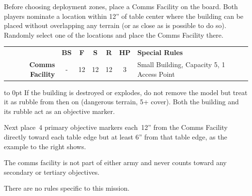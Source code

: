 

\begin{tablesetup}

  \hammerandanvil

  \smallskip%
  Before choosing deployment zones, place a Comms Facility on the
  board.  Both players nominate a location within 12'' of table center
  where the building can be placed without overlapping any terrain (or
  as close as is possible to do so).  Randomly select one of the
  locations and place the Comms Facility there.

  \begin{center}    
  \begin{tabular}[t]{rcccccL{3in}}
    & {\bf BS} &  {\bf F} & {\bf S} & {\bf R} & {\bf HP} & {\bf Special Rules}\\
    {\bf Comms Facility} & - & 12 & 12 & 12 & 3 & Small Building, Capacity 5, 1 Access Point\\
  \end{tabular}
  \end{center}


  \noindent
  \begin{minipage}[t]{\linewidth-(2.5in+1em)}\vbox to 0pt{}
    \hspace{1em} If the building is destroyed or explodes, do not
    remove the model but treat it as rubble from then on (dangerous
    terrain, 5+ cover).  Both the building and its rubble act as an
    objective marker.

    \hspace{1em} Next place~4 primary objective markers each~12'' from
    the Comms Facility directly toward each table edge but at least
    6'' from that table edge, as the example to the right shows.

    \hspace{1em} The comms facility is not part of either army and
    never counts toward any secondary or tertiary objectives.


    \begin{missionrules}
      \bigskip
      There are no rules specific to this mission.
    \end{missionrules}


\end{minipage}
\end{tablesetup}
